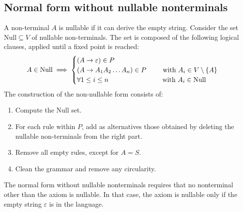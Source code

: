 \subsection{Normal form without nullable nonterminals}
A non-terminal $A$ is nullable if it can derive the empty string. 
Consider the set $\text{Null} \subseteq V$ of nullable non-terminals. 
The set is composed of the following logical clauses, applied until a fixed point is reached:
\[A \in \textnormal{Null} \implies\begin{cases}
    (A \rightarrow \varepsilon) \in P\\
    (A \rightarrow A_1A_2\dots A_n) \in P \qquad\:\: \textnormal{with } A_i \in V \setminus \{A\} \\
    \forall 1 \leq i \leq n \qquad\qquad\qquad\qquad \textnormal{with } A_i \in \textnormal{Null}
\end{cases}\]
The construction of the non-nullable form consists of:
\begin{enumerate}
    \item Compute the Null set. 
    \item For each rule within $P$, add as alternatives those obtained by deleting the nullable non-terminals from the right part.
    \item Remove all empty rules, except for $A=S$.
    \item Clean the grammar and remove any circularity.
\end{enumerate}
The normal form without nullable nonterminals requires that no nonterminal other than the axiom is nullable. 
In that case, the axiom is nullable only if the empty string $\varepsilon$ is in the language.

